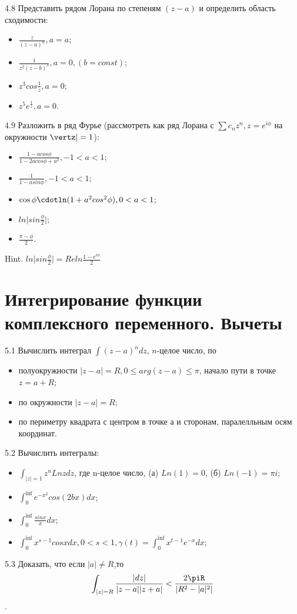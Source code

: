 \documentclass{article}
\begin{document}
4.8 Представить рядом Лорана по степеням $( z − a )$ и определить
область сходимости:
\begin{itemize}
\item $\frac{z}{(z-a)^n}, a=a$;
\item $\frac{1}{z^2(z-b)^3}, a=0, (b=const)$;
\item $z^3cos\frac{1}{z},a=0$;
\item $z^5e^\frac{1}{z},a=0$.
\end{itemize}
4.9 Разложить в ряд Фурье (рассмотреть как ряд Лорана с $\sum c_nz^n, z=e^{i\phi}$ на окружности $\vertz\vert=1$):
\begin{itemize}
\item $\frac{1-acos\phi}{1-2acos\phi+a^2}, -1<a<1$;
\item $\frac{1}{1-asin\phi}, -1<a<1$;
\item $\cos\phi\cdotln(1+a^2cos^2\phi), 0<a<1$;
\item $ln\vert sin \frac{\phi}{2} \vert$;
\item $\frac{\pi-\phi}{2}$.
\end{itemize}
Hint. $ln\vert sin \frac{\phi}{2} \vert = Re{ln\frac{1-e^{i\phi}}{2}}$

\section{Интегрирование функции комплексного переменного. Вычеты}

5.1 Вычислить интеграл $\int (z-a)^ndz$, $n$-целое число, по
\begin{itemize}
\item полуокружности $\vert z - a \vert =R,0\leq arg(z-a)\leq \pi$, начало пути в точке $z=a+R$; 
\item по окружности $\vert z - a \vert =R$;
\item по периметру квадрата с центром в точке а и сторонам, паралелльным осям координат.
\end{itemize} 
5.2 Вычислить интегралы:
\begin{itemize}
\item $\int_{\vert z \vert = 1}z^nLnzdz$, где n-целое число, (а) $Ln(1)=0$, (б) $Ln(-1)=\pi i$;
\item $\int_0^{\inf} e^{-x^2}cos(2bx)dx$;
\item $\int_0^{\inf} \frac{sinx}{x}dx$;
\item $\int_0^{\inf} x^{s-1}cosxdx, 0<s<1, \gamma(t)=\int_0^{\inf} x^{t-1}e^{-x}dx$;
\end{itemize}
5.3 Доказать, что если $\vert a \vert \neq R$,то $$\int_{\vert z\vert = R} \frac{\vert dz \vert}{\vert z-a\vert \vert z+a \vert} < \frac{2\piR}{\vert R^2 - \vert a\vert^2\vert}$$.
\end{document}
